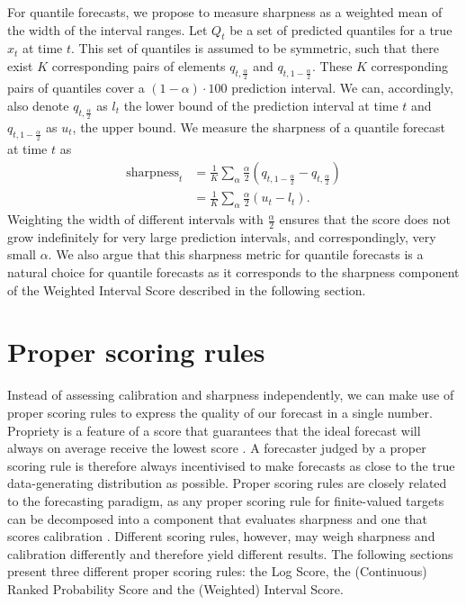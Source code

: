 \documentclass[
]{book}
\begin{document}
For quantile forecasts, we propose to measure sharpness as a weighted mean of the width of the interval ranges. Let \(Q_t\) be a set of predicted quantiles for a true \(x_t\) at time \(t\). This set of quantiles is assumed to be symmetric, such that there exist \(K\) corresponding pairs of elements \(q_{t, \frac{\alpha}{2}}\) and \(q_{t, 1-\frac{\alpha}{2}}\). These \(K\) corresponding pairs of quantiles cover a \((1 - \alpha) \cdot 100\) prediction interval. We can, accordingly, also denote \(q_{t, \frac{\alpha}{2}}\) as \(l_t\) the lower bound of the prediction interval at time \(t\) and \(q_{t, 1-\frac{\alpha}{2}}\) as \(u_t\), the upper bound. We measure the sharpness of a quantile forecast at time \(t\) as
\begin{align*}
\text{sharpness}_t &= \frac{1}{K} \sum_{\alpha} \frac{\alpha}{2} (q_{t, 1 - \frac{\alpha}{2}} - q_{t, \frac{\alpha}{2}}) \\
                   &= \frac{1}{K} \sum_{\alpha} \frac{\alpha}{2} (u_t - l_t).
\end{align*}
Weighting the width of different intervals with \(\frac{\alpha}{2}\) ensures that the score does not grow indefinitely for very large prediction intervals, and correspondingly, very small \(\alpha\). We also argue that this sharpness metric for quantile forecasts is a natural choice for quantile forecasts as it corresponds to the sharpness component of the Weighted Interval Score described in the following section.

\hypertarget{proper-scoring-rules}{%
\section{Proper scoring rules}\label{proper-scoring-rules}}

Instead of assessing calibration and sharpness independently, we can make use of proper scoring rules to express the quality of our forecast in a single number. Propriety is a feature of a score that guarantees that the ideal forecast will always on average receive the lowest score \citep{gneitingStrictlyProperScoring2007}. A forecaster judged by a proper scoring rule is therefore always incentivised to make forecasts as close to the true data-generating distribution as possible. Proper scoring rules are closely related to the forecasting paradigm, as any proper scoring rule for finite-valued targets can be decomposed into a component that evaluates sharpness and one that scores calibration \citep{brockerReliabilitySufficiencyDecomposition2009a, hersbachDecompositionContinuousRanked2000}. Different scoring rules, however, may weigh sharpness and calibration differently and therefore yield different results. The following sections present three different proper scoring rules: the Log Score, the (Continuous) Ranked Probability Score and the (Weighted) Interval Score.
\end{document}
